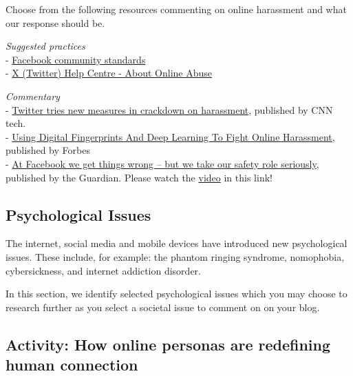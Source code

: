 \documentclass[
]{book}
\theoremstyle{definition}
\theoremstyle{definition}
\theoremstyle{definition}
\theoremstyle{definition}
\theoremstyle{remark}
\begin{document}
\begin{reflect}
Choose from the following resources commenting on online harassment and what our response should be.

\emph{Suggested practices}\\
- \href{https://transparency.fb.com/en-gb/policies/community-standards/?source=https\%3A\%2F\%2Fwww.facebook.com\%2Fcommunitystandards\%2F}{Facebook community standards}\\
- \href{https://help.twitter.com/en/safety-and-security/cyber-bullying-and-online-abuse}{X (Twitter) Help Centre - About Online Abuse}

\emph{Commentary}\\
- \href{https://money.cnn.com/2017/02/07/technology/twitter-combat-harassment-features/index.html?iid=EL}{Twitter tries new measures in crackdown on harassment}, published by CNN tech.\\
- \href{https://www.forbes.com/sites/kalevleetaru/2017/02/06/using-digital-fingerprints-and-deep-learning-to-fight-online-harassment/?sh=49fc9bf06908}{Using Digital Fingerprints And Deep Learning To Fight Online Harassment}, published by Forbes\\
- \href{https://www.theguardian.com/commentisfree/2017/may/22/facebook-get-things-wrong-but-safety-role-seriously}{At Facebook we get things wrong -- but we take our safety role seriously}, published by the Guardian. Please watch the \href{https://www.theguardian.com/news/video/2017/may/21/the-facebook-files-sex-violence-and-hate-speech-video-explainer}{video} in this link!
\end{reflect}

\hypertarget{psychological-issues}{%
\subsection{Psychological Issues}\label{psychological-issues}}

The internet, social media and mobile devices have introduced new psychological issues. These include, for example: the phantom ringing syndrome, nomophobia, cybersickness, and internet addiction disorder.

In this section, we identify selected psychological issues which you may choose to research further as you select a societal issue to comment on on your blog.

\hypertarget{activity-how-online-personas-are-redefining-human-connection}{%
\subsection*{Activity: How online personas are redefining human connection}\label{activity-how-online-personas-are-redefining-human-connection}}
\end{document}
